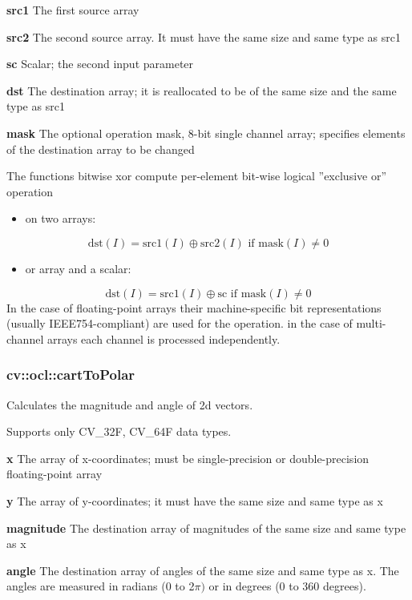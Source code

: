 \documentclass{article}
\begin{document}
\textbf{src1 }The first source array

\textbf{src2 }The second source array. It must have the same size and same
type as src1

\textbf{sc }Scalar; the second input parameter

\textbf{dst }The destination array; it is reallocated to be of the same size
and the same type as src1

\textbf{mask }The optional operation mask, 8-bit single channel array;
specifies elements of the destination array to be changed

The functions bitwise xor compute per-element bit-wise logical ''exclusive
or'' operation

\begin{itemize}
\item on two arrays:
\end{itemize}
\[
\mbox{dst}\left( I \right)=\mbox{src1}\left( I \right)\oplus
\mbox{src2}\left( I \right)\mbox{ if mask}\left( I \right)\ne 0
\]
\begin{itemize}
\item or array and a scalar:
\end{itemize}
\[
\mbox{dst}\left( I \right)=\mbox{src1}\left( I \right)\oplus \mbox{sc if
mask}\left( I \right)\ne 0
\]
In the case of floating-point arrays their machine-specific bit
representations (usually IEEE754-compliant) are used for the operation. in
the case of multi-channel arrays each channel is processed independently.

\newpage

\subsubsection{cv::ocl::cartToPolar }
\label{subsubsec:mylabel10}
Calculates the magnitude and angle of 2d vectors.

Supports only CV{\_}32F, CV{\_}64F data types.

\textbf{x }The array of x-coordinates; must be single-precision or
double-precision floating-point array

\textbf{y }The array of y-coordinates; it must have the same size and same
type as x

\textbf{magnitude }The destination array of magnitudes of the same size and
same type as x

\textbf{angle }The destination array of angles of the same size and same
type as x. The angles are measured in radians (0 to 2$\pi )$ or in degrees
(0 to 360 degrees).
\end{document}
